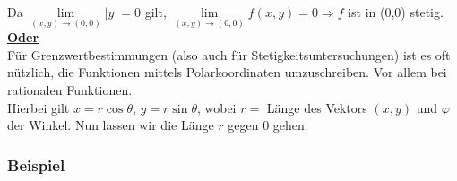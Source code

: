 \noindent Da $\mathop {\lim }\limits_{(x,y) \to (0,0)} \left| y \right| = 0$ gilt, $\mathop {\lim }\limits_{(x,y) \to (0,0)} f(x,y) = 0 \Rightarrow f$ ist in (0,0) stetig.\\

\noindent \textbf{\underline{Oder}}\\

\noindent Für Grenzwertbestimmungen (also auch für Stetigkeitsuntersuchungen) ist es oft nützlich, die Funktionen mittels Polarkoordinaten umzuschreiben. Vor allem bei rationalen Funktionen. \\

Hierbei gilt $x=r\cos\theta$, $y=r\sin\theta$, wobei $r=$ Länge des Vektors $(x,y)$ und $\varphi$ der Winkel. Nun lassen wir die Länge $r$ gegen 0 gehen.

\subsubsection*{Beispiel}
